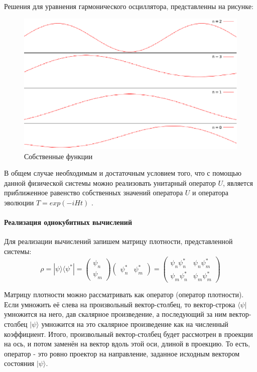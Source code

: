 \documentclass[14pt,a4paper]{PhDthesis}
\begin{document}
Решения для уравнения гармонического осциллятора, представленны на рисунке:
\begin{figure}[h]
\centering\includegraphics[width=.50\textwidth]{images/function.eps}
\caption{Собственные функции}\label{ris:kk1}
\end{figure}

В общем случае необходимым и достаточным условием того, что с помощью данной физической системы можно реализовать унитарный оператор $U$, является
приближенное равенство собственных значений оператора $U$ и оператора эволюции $T = exp(-iHt)$ \cite{Menskiy:2001ru}.

\paragraph{Реализация однокубитных вычислений}
Для реализации вычислений запишем матрицу плотности, представленной системы:
\begin{equation}
\rho = |\psi\rangle\langle\psi^{*}| = \begin{pmatrix} \psi_{n}\\
 						\psi_{m}
 		\end{pmatrix} \begin{pmatrix}\psi^{*}_{n} & \psi^{*}_{m}\end{pmatrix}  = \begin{pmatrix} \psi_{n}\psi^{*}_{n} & \psi_{n}\psi^{*}_{m} \\ 
 																	 					\psi_{m}\psi^{*}_{n} & \psi_{m}\psi^{*}_{m} 		 																		 
 		 																		 \end{pmatrix}
\end{equation}

Матрицу плотности можно рассматривать как оператор (оператор плотности). Если умножить её слева на произвольный вектор-столбец, то вектор-строка $\langle\psi\rvert$ умножится на него, дав скалярное произведение, а последующий за ним вектор-столбец $\lvert\psi\rangle$ умножится на это скалярное произведение как на численный коэффициент. Итого, произвольный вектор-столбец будет рассмотрен в проекции на ось, и потом заменён на вектор вдоль этой оси, длиной в проекцию. То есть, оператор - это ровно проектор на направление, заданное исходным вектором состояния $\lvert\psi\rangle.$
\end{document}
